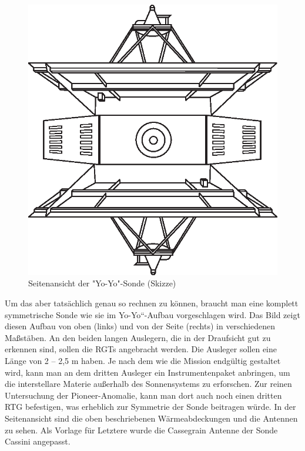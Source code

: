 \begin{figure}[htnb]
\begin{minipage}[t]{.4\linewidth}
	\includegraphics[width=\linewidth]{images/yoyoside}
  \caption{Seitenansicht der "Yo-Yo"-Sonde (Skizze)\cite{Nieto2004}}\label{fig:yoyoside}
\end{minipage}
 \end{figure}

Um das aber tats\"achlich genau so rechnen zu k\"onnen, braucht man
eine komplett symmetrische Sonde wie sie im
{\quotedblbase}Yo-Yo``-Aufbau vorgeschlagen wird. Das Bild zeigt diesen
Aufbau von oben (links) und von der Seite (rechts) in verschiedenen
Ma{\ss}st\"aben. An den beiden langen Auslegern, die in der Draufsicht
gut zu erkennen sind, sollen die RGTs ange\-bracht werden. Die Ausleger sollen
eine L\"ange von 2 -- 2,5 m haben. Je nach dem wie die Mission
endg\"ultig gestaltet wird, kann man an dem dritten Ausleger ein
Instrumentenpaket an\-bringen, um die interstellare Materie
au{\ss}erhalb des Sonnensystems zu erforschen. Zur rei\-nen
Untersuchung der Pioneer-Anomalie, kann man dort auch noch einen dritten
RTG befestigen, was erheblich zur Symmetrie der Sonde beitragen
w\"urde. In der Seitenansicht sind die oben beschriebenen
W\"armeabdeckungen und die Antennen zu sehen. Als Vorlage f\"ur
Letztere wurde die Cassegrain Antenne der Sonde Cassini angepasst.


